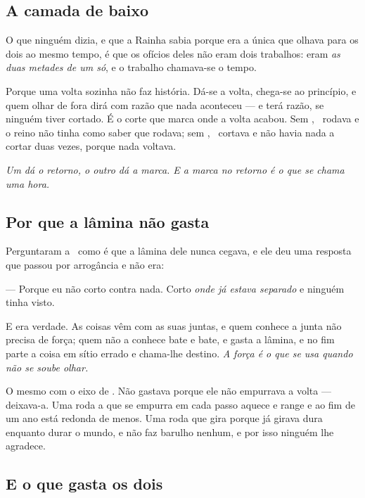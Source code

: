 \documentclass[livro.tex]{subfiles}
\begin{document}
\subsection*{A camada de baixo}

O que ninguém dizia, e que a Rainha sabia porque era a única que olhava para os dois ao mesmo
tempo, é que os ofícios deles não eram dois trabalhos: eram \emph{as duas metades de um só}, e o
trabalho chamava-se o tempo.

\medskip

Porque uma volta sozinha não faz história. Dá-se a volta, chega-se ao princípio, e quem olhar de
fora dirá com razão que nada aconteceu --- e terá razão, se ninguém tiver cortado. É o corte que
marca onde a volta acabou. Sem \Drk, \Ben\ rodava e o reino não tinha como saber que rodava; sem
\Ben, \Drk\ cortava e não havia nada a cortar duas vezes, porque nada voltava.

\medskip

\emph{Um dá o retorno, o outro dá a marca. E a marca no retorno é o que se chama uma hora.}

\subsection*{Por que a lâmina não gasta}

Perguntaram a \Drk\ como é que a lâmina dele nunca cegava, e ele deu uma resposta que passou por
arrogância e não era:

\medskip

--- Porque eu não corto contra nada. Corto \emph{onde já estava separado} e ninguém tinha visto.

\medskip

E era verdade. As coisas vêm com as suas juntas, e quem conhece a junta não precisa de força; quem
não a conhece bate e bate, e gasta a lâmina, e no fim parte a coisa em sítio errado e chama-lhe
destino. \emph{A força é o que se usa quando não se soube olhar.}

\medskip

O mesmo com o eixo de \Ben. Não gastava porque ele não empurrava a volta --- deixava-a. Uma roda a
que se empurra em cada passo aquece e range e ao fim de um ano está redonda de menos. Uma roda que
gira porque já girava dura enquanto durar o mundo, e não faz barulho nenhum, e por isso ninguém
lhe agradece.

\subsection*{E o que gasta os dois}
\end{document}
